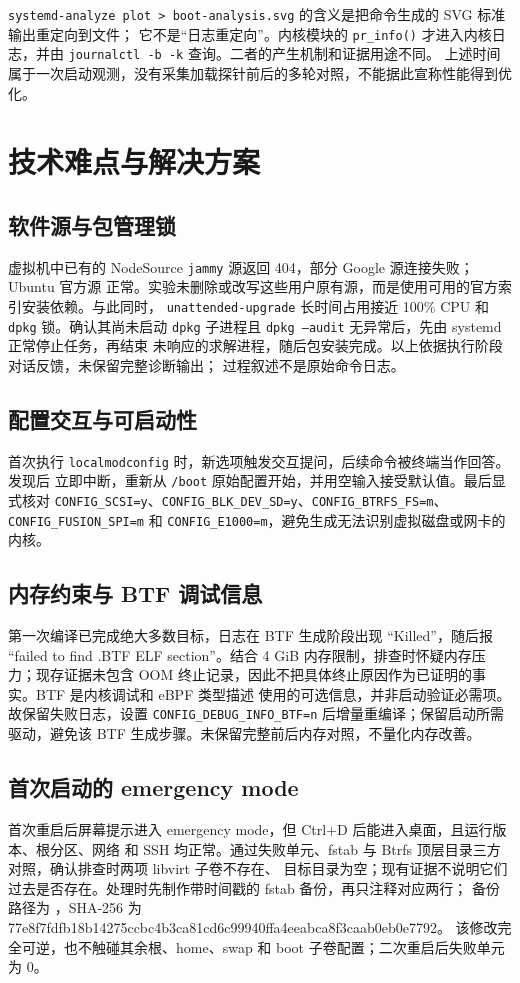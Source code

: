 \documentclass[UTF8,zihao=-4,openany,fontset=none]{ctexrep}
\begin{document}
\texttt{systemd-analyze plot > boot-analysis.svg} 的含义是把命令生成的 SVG 标准输出重定向到文件；
它不是“日志重定向”。内核模块的 \texttt{pr\_info()} 才进入内核日志，并由
\texttt{journalctl -b -k} 查询。二者的产生机制和证据用途不同。
上述时间属于一次启动观测，没有采集加载探针前后的多轮对照，不能据此宣称性能得到优化。

\chapter{技术难点与解决方案}

\section{软件源与包管理锁}
虚拟机中已有的 NodeSource \texttt{jammy} 源返回 404，部分 Google 源连接失败；Ubuntu 官方源
正常。实验未删除或改写这些用户原有源，而是使用可用的官方索引安装依赖。与此同时，
\texttt{unattended-upgrade} 长时间占用接近 100\% CPU 和 \texttt{dpkg} 锁。确认其尚未启动
\texttt{dpkg} 子进程且 \texttt{dpkg --audit} 无异常后，先由 systemd 正常停止任务，再结束
未响应的求解进程，随后包安装完成。以上依据执行阶段对话反馈，未保留完整诊断输出；
过程叙述不是原始命令日志。

\section{配置交互与可启动性}
首次执行 \texttt{localmodconfig} 时，新选项触发交互提问，后续命令被终端当作回答。发现后
立即中断，重新从 \texttt{/boot} 原始配置开始，并用空输入接受默认值。最后显式核对
\texttt{CONFIG\_SCSI=y}、\texttt{CONFIG\_BLK\_DEV\_SD=y}、\texttt{CONFIG\_BTRFS\_FS=m}、
\texttt{CONFIG\_FUSION\_SPI=m} 和 \texttt{CONFIG\_E1000=m}，避免生成无法识别虚拟磁盘或网卡的内核。

\section{内存约束与 BTF 调试信息}
第一次编译已完成绝大多数目标，日志在 BTF 生成阶段出现 ``Killed''，随后报
``failed to find .BTF ELF section''。结合 4 GiB 内存限制，排查时怀疑内存压力；现存证据未包含 OOM
终止记录，因此不把具体终止原因作为已证明的事实。BTF 是内核调试和 eBPF 类型描述
使用的可选信息，并非启动验证必需项。故保留失败日志，设置
\texttt{CONFIG\_DEBUG\_INFO\_BTF=n} 后增量重编译；保留启动所需驱动，避免该 BTF 生成步骤。未保留完整前后内存对照，不量化内存改善。

\section{首次启动的 emergency mode}
首次重启后屏幕提示进入 emergency mode，但 Ctrl+D 后能进入桌面，且运行版本、根分区、网络
和 SSH 均正常。通过失败单元、fstab 与 Btrfs 顶层目录三方对照，确认排查时两项 libvirt 子卷不存在、
目标目录为空；现有证据不说明它们过去是否存在。处理时先制作带时间戳的
fstab 备份，再只注释对应两行；
备份路径为 ，SHA-256 为
{\small\ttfamily 77e8f7fdfb18b14275ccbc4b3ca81cd6c99940ffa4eeabca8f3caab0eb0e7792}。
该修改完全可逆，也不触碰其余根、home、swap 和 boot 子卷配置；二次重启后失败单元为 0。
\end{document}
